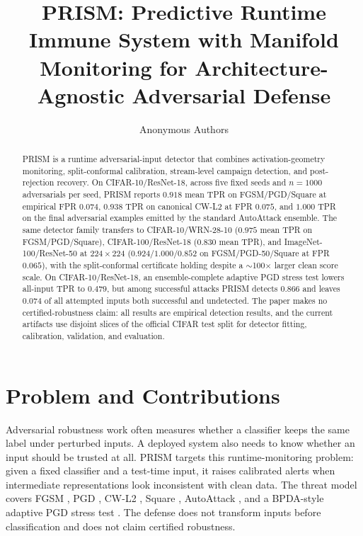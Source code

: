 \documentclass{article}
\title{\textsc{PRISM}: Predictive Runtime Immune System with Manifold Monitoring for Architecture-Agnostic Adversarial Defense}
\author{Anonymous Authors}
\newcommand{\prism}{\textsc{PRISM}\xspace}
\begin{document}
\maketitle

\begin{abstract}
\prism is a runtime adversarial-input detector that combines activation-geometry monitoring, split-conformal calibration, stream-level campaign detection, and post-rejection recovery. On CIFAR-10/ResNet-18, across five fixed seeds and $n=1000$ adversarials per seed, \prism reports $0.918$ mean TPR on FGSM/PGD/Square at empirical FPR $0.074$, $0.938$ TPR on canonical CW-L2 at FPR $0.075$, and $1.000$ TPR on the final adversarial examples emitted by the standard AutoAttack ensemble. The same detector family transfers to CIFAR-10/WRN-28-10 ($0.975$ mean TPR on FGSM/PGD/Square), CIFAR-100/ResNet-18 ($0.830$ mean TPR), and ImageNet-100/ResNet-50 at $224\times224$ ($0.924/1.000/0.852$ on FGSM/PGD-50/Square at FPR $0.065$), with the split-conformal certificate holding despite a $\sim$100$\times$ larger clean score scale. On CIFAR-10/ResNet-18, an ensemble-complete adaptive PGD stress test lowers all-input TPR to $0.479$, but among successful attacks \prism detects $0.866$ and leaves $0.074$ of all attempted inputs both successful and undetected. The paper makes no certified-robustness claim: all results are empirical detection results, and the current artifacts use disjoint slices of the official CIFAR test split for detector fitting, calibration, validation, and evaluation.
\end{abstract}

\section{Problem and Contributions}
Adversarial robustness work often measures whether a classifier keeps the same label under perturbed inputs. A deployed system also needs to know whether an input should be trusted at all. \prism targets this runtime-monitoring problem: given a fixed classifier and a test-time input, it raises calibrated alerts when intermediate representations look inconsistent with clean data. The threat model covers FGSM \citep{goodfellow2015explaining}, PGD \citep{madry2017towards}, CW-L2 \citep{carlini2017adversarial}, Square \citep{andriushchenko2020square}, AutoAttack \citep{croce2020reliable}, and a BPDA-style adaptive PGD stress test \citep{athalye2018obfuscated,carlini2019evaluating}. The defense does not transform inputs before classification and does not claim certified robustness.
\end{document}
